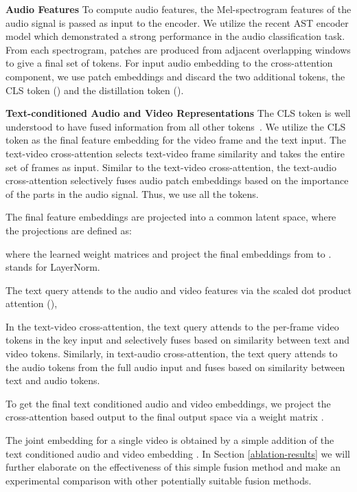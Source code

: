\documentclass[10pt,twocolumn,letterpaper]{article}
\begin{document}
\noindent \textbf{Audio Features} To compute audio features, the Mel-spectrogram features of the audio signal  is passed as input to the encoder. We utilize the recent AST encoder model \cite{gong21b_interspeech} which demonstrated a strong performance in the audio classification task. From each spectrogram,  patches are produced from adjacent overlapping windows to give a final set of  tokens. For input audio embedding  to the cross-attention component, we use  patch embeddings and discard the two additional tokens, the CLS token () and the distillation token ().

\noindent \textbf{Text-conditioned Audio and Video Representations} 
The CLS token is well understood to have fused information from all other tokens~\cite{deit,gong21b_interspeech}. We utilize the CLS token as the final feature embedding for the video frame and the text input. The text-video cross-attention selects text-video frame similarity and takes the entire set of  frames  as input. Similar to the text-video cross-attention, the text-audio cross-attention selectively fuses audio patch embeddings based on the importance of the parts in the audio signal. Thus, we use all the  tokens.

The final feature embeddings are projected into a common latent space, where the projections are defined as:

where the learned weight matrices  and  project the final embeddings from  to .  stands for LayerNorm.

The text query attends to the audio and video features via the scaled dot product attention (), 



In the text-video cross-attention, the text query attends to the per-frame video tokens in the key input and selectively fuses based on similarity between text and video tokens. Similarly, in text-audio cross-attention, the text query attends to the audio tokens from the full audio input and fuses based on similarity between text and audio tokens.

To get the final text conditioned audio and video embeddings, we project the cross-attention based output to the final output space via a weight matrix .


The joint embedding  for a single video is obtained by a simple addition of the text conditioned audio  and video embedding . In Section \ref{ablation-results} we will further elaborate on the effectiveness of this simple fusion method and make an experimental comparison with other potentially suitable fusion methods. 
\end{document}

